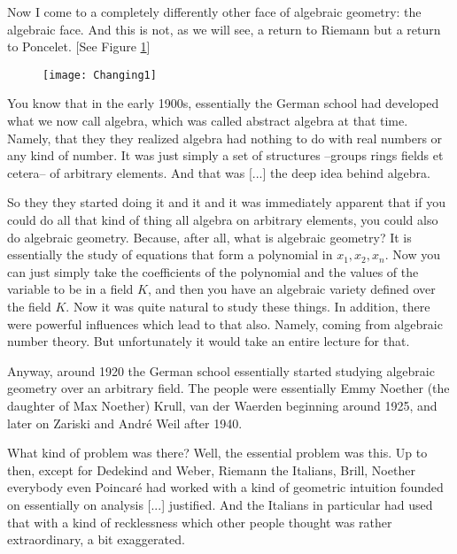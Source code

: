 \documentclass{article}
\begin{document}
Now I come to a completely differently other face of algebraic geometry:
the algebraic face.
And this is not, as we will see, a return to Riemann but a return to Poncelet. [See Figure \ref{fig:changing1}]





\begin{figure}[ht]
\caption{}
\label{fig:changing1}
\centering
\texttt{[image: Changing1]}
\end{figure}

You know that in the early 1900s, essentially the German school
had developed what we now call algebra,
which was called abstract algebra at that time.
Namely, that they they realized algebra had nothing to do with real numbers 
or any kind of number.
It was just simply a set of structures 
--groups rings fields et cetera-- of arbitrary elements.
And that was [...] the deep idea behind algebra.

So they they started doing it 
and it and it was immediately apparent
that if you could do all that kind of thing 
all algebra on arbitrary elements,
you could also do algebraic geometry.
Because, after all, what is algebraic geometry?
It is essentially the study of equations 
that form a polynomial in $x_1, x_2, x_n$.
Now you can just simply take the coefficients of the polynomial
and the values of the variable to be in a field $K$,
and then you have an algebraic variety defined over the field $K$.
Now it was quite natural to study these things.
In addition, there were powerful influences which lead to that also.
Namely, coming from algebraic number theory.
But unfortunately it would take an entire lecture for that.

Anyway, around 1920 the German school essentially
started studying algebraic geometry over an arbitrary field.
The people were essentially Emmy Noether (the daughter of Max Noether)
Krull, van der Waerden beginning around 1925,
and later on Zariski and Andr\'e Weil after 1940.

What kind of problem was there?
Well, the essential problem was this.
Up to then, except for Dedekind and Weber,
Riemann the Italians, Brill, Noether everybody even Poincar\'e
had worked with a kind of geometric intuition
founded on essentially on analysis [...] justified.
And the Italians in particular 
had used that with a kind of recklessness
which other people thought was rather extraordinary,
a bit exaggerated.
\end{document}
